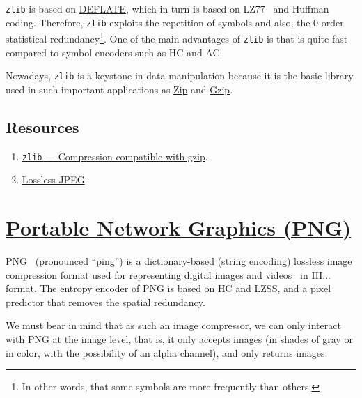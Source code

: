 \texttt{zlib} is based on
\href{https://en.wikipedia.org/wiki/Deflate}{DEFLATE}, which in turn
is based on LZ77~\cite{vruiz__LZW,ruiz2000compresion} and Huffman
coding. Therefore, \texttt{zlib} exploits the repetition of symbols
and also, the 0-order statistical redundancy\footnote{In other
  words, that some symbols are more frequently than others.}. One of
the main advantages of \texttt{zlib} is that is quite fast compared to
symbol encoders such as HC and AC.

Nowadays, \texttt{zlib} is a keystone in data manipulation because it
is the basic library used in such important applications as
\href{https://en.wikipedia.org/wiki/ZIP_(file_format)}{Zip} and
\href{https://en.wikipedia.org/wiki/Gzip}{Gzip}.

\subsection*{Resources}
\begin{enumerate}
\item \href{https://docs.python.org/3/library/zlib.html}{\texttt{zlib}
    — Compression compatible with gzip}.
\item \href{https://en.wikipedia.org/wiki/Lossless_JPEG}{Lossless JPEG}.
\end{enumerate}

\section{\href{https://en.wikipedia.org/wiki/Portable_Network_Graphics}{Portable Network Graphics (PNG)}}
PNG~\cite{vruiz__PNG} (pronounced ``ping'') is a dictionary-based
(string encoding)
\href{https://en.wikipedia.org/wiki/Lossless_compression}{lossless
  image compression format} used for representing
\href{https://en.wikipedia.org/wiki/Digital_data}{digital}
\href{https://en.wikipedia.org/wiki/Digital_image}{images} and
\href{https://en.wikipedia.org/wiki/Video}{videos}~\cite{vruiz__image_video}
in III... format. The entropy encoder
of PNG is based on HC and LZSS, and a pixel predictor that removes the
spatial redundancy.

We must bear in mind that as such an image compressor, we can only
interact with PNG at the image level, that is, it only accepts images
(in shades of gray or in color, with the possibility of an
\href{https://en.wikipedia.org/wiki/Alpha_compositing}{alpha channel}),
and only returns images.



